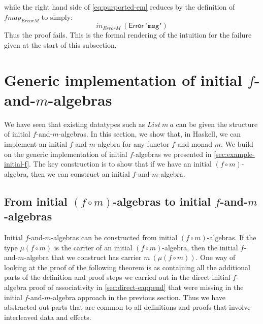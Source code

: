 \documentclass{jfp1}
\begin{document}
while the right hand side of \autoref{eq:purported-em} reduces by the
definition of $\mathit{fmap}_{\mathit{ErrorM}}$ to simply:
\begin{displaymath}
  \mathit{in}_{\mathit{ErrorM}}~(\mathsf{Error}~\texttt{"msg"})
\end{displaymath}
Thus the proof fails. This is the formal rendering of the intuition
for the failure given at the start of this subsection.


\section{Generic implementation of initial \texorpdfstring{$f$}{f}-and-\texorpdfstring{$m$}{m}-algebras}
\label{sec:impl-f-and-m}

We have seen that existing datatypes such as $\mathit{List}~m~a$ can
be given the structure of initial $f$-and-$m$-algebras. In this
section, we show that, in Haskell, we can implement an initial
$f$-and-$m$-algebra for any functor $f$ and monad $m$. We build on the
generic implementation of initial $f$-algebras we presented in
\autoref{sec:example-initial-f}. The key construction is to show that
if we have an initial $(f \circ m)$-algebra, then we can construct an
initial $f$-and-$m$-algebra.


\subsection{From initial \texorpdfstring{$(f \circ m)$}{(f . m)}-algebras to initial \texorpdfstring{$f$}{f}-and-\texorpdfstring{$m$}{m}-algebras}
\label{sec:from-initial}

Initial $f$-and-$m$-algebras can be constructed from initial $(f \circ
m)$-algebras. If the type $\mu(f \circ m)$ is the carrier of an
initial $(f \circ m)$-algebra, then the initial $f$-and-$m$-algebra
that we construct has carrier $m~(\mu (f \circ m))$. One way of
looking at the proof of the following theorem is as containing all the
additional parts of the definition and proof steps we carried out in
the direct initial $f$-algebra proof of associativity in
\autoref{sec:direct-eappend} that were missing in the initial
$f$-and-$m$-algebra approach in the previous section. Thus we have
abstracted out parts that are common to all definitions and proofs
that involve interleaved data and effects.
\end{document}
